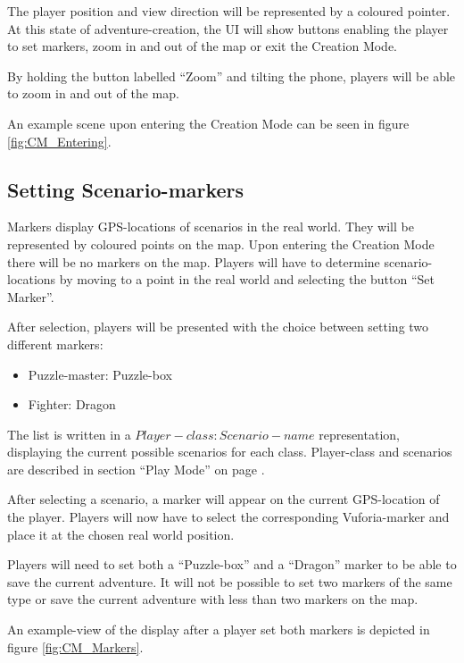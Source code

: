 \documentclass{sigchi-ext}
\begin{document}
The player position and view direction will be represented by a coloured pointer. At this state of adventure-creation, the UI will show buttons enabling the player to set markers, zoom in and out of the map or exit the Creation Mode.

By holding the button labelled ``Zoom'' and tilting the phone, players will be able to zoom in and out of the map.

An example scene upon entering the Creation Mode can be seen in figure \ref{fig:CM_Entering}.
 

\subsection{Setting Scenario-markers}

Markers display GPS-locations of scenarios in the real world. They will be represented by coloured points on the map. Upon entering the Creation Mode there will be no markers on the map. Players will have to determine scenario-locations by moving to a point in the real world and selecting the button ``Set Marker''.

After selection, players will be presented with the choice between setting two different markers:
\begin{itemize}\compresslist%
	\item Puzzle-master: Puzzle-box
	\item Fighter: Dragon
\end{itemize}
The list is written in a $Player-class: Scenario-name$ representation, displaying the current possible scenarios for each class. Player-class and scenarios are described in section ``Play Mode'' on page \pageref{sec:Play}.

After selecting a scenario, a marker will appear on the current GPS-location of the player. Players will now have to select the corresponding Vuforia-marker and place it at the chosen real world position.

Players will need to set both a ``Puzzle-box'' and a ``Dragon'' marker to be able to save the current adventure. It will not be possible to set two markers of the same type or save the current adventure with less than two markers on the map.

An example-view of the display after a player set both markers is depicted in figure \ref{fig:CM_Markers}.
\end{document}
